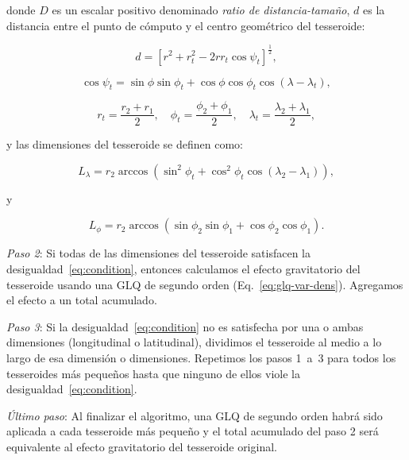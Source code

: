 \noindent
donde $D$ es un escalar positivo denominado \emph{ratio de distancia-tamaño},
$d$ es la distancia entre el punto de cómputo y el centro geométrico del
tesseroide:

\begin{equation}
    d = \left[
        r^2 + r_t^2 - 2 r r_t \cos\psi_t
        \right]^{\frac{1}{2}} ,
    \label{eq:distance}
\end{equation}

\begin{equation}
    \cos\psi_t =
        \sin\phi\sin\phi_t + \cos\phi\cos\phi_t\cos(\lambda - \lambda_t),
\end{equation}

\begin{equation}
    r_t = \frac{r_2 + r_1}{2}, \quad
    \phi_t = \frac{\phi_2 + \phi_1}{2}, \quad
    \lambda_t = \frac{\lambda_2 + \lambda_1}{2},
\end{equation}

\noindent
y las dimensiones del tesseroide se definen como:

\begin{equation}
    L_\lambda = r_2 \arccos(\sin^2\phi_t +
        \cos^2\phi_t\cos(\lambda_2 - \lambda_1)),
    \label{eq:sizelon}
\end{equation}

\noindent y

\begin{equation}
    L_\phi = r_2 \arccos(\sin\phi_2\sin\phi_1 + \cos\phi_2\cos\phi_1).
\end{equation}

\textit{Paso 2}:
Si todas de las dimensiones del tesseroide satisfacen la desigualdad~\ref{eq:condition},
entonces calculamos el efecto gravitatorio del tesseroide usando una \ac{GLQ}
de segundo orden (Eq.~\ref{eq:glq-var-dens}).
Agregamos el efecto a un total acumulado.

\textit{Paso 3}:
Si la desigualdad~\ref{eq:condition} no es satisfecha por una o ambas
dimensiones (longitudinal o latitudinal), dividimos el tesseroide al medio a lo
largo de esa dimensión o dimensiones.
Repetimos los pasos 1~a~3 para todos los tesseroides más pequeños hasta que
ninguno de ellos viole la desigualdad~\ref{eq:condition}.

\textit{Último paso}:
Al finalizar el algoritmo, una \ac{GLQ} de segundo orden habrá sido aplicada
a cada tesseroide más pequeño y el total acumulado del paso 2 será equivalente
al efecto gravitatorio del tesseroide original.

